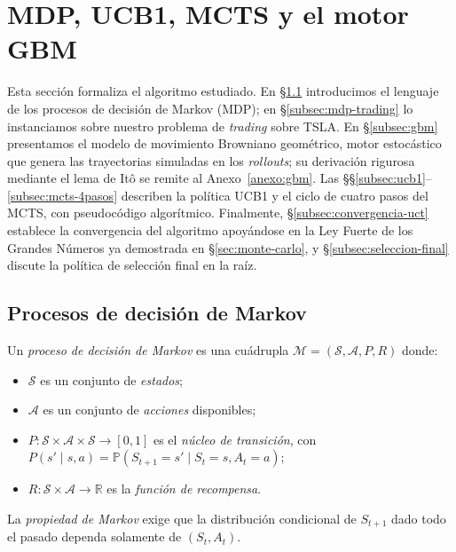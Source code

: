 \section{MDP, UCB1, MCTS y el motor GBM}
\label{sec:mdp-mcts}

Esta sección formaliza el algoritmo estudiado. En §\ref{subsec:mdp} introducimos el lenguaje de los procesos de decisión de Markov (MDP); en §\ref{subsec:mdp-trading} lo instanciamos sobre nuestro problema de \emph{trading} sobre TSLA. En §\ref{subsec:gbm} presentamos el modelo de movimiento Browniano geométrico, motor estocástico que genera las trayectorias simuladas en los \emph{rollouts}; su derivación rigurosa mediante el lema de Itô se remite al Anexo~\ref{anexo:gbm}. Las §§\ref{subsec:ucb1}--\ref{subsec:mcts-4pasos} describen la política UCB1 y el ciclo de cuatro pasos del MCTS, con pseudocódigo algorítmico. Finalmente, §\ref{subsec:convergencia-uct} establece la convergencia del algoritmo apoyándose en la Ley Fuerte de los Grandes Números ya demostrada en §\ref{sec:monte-carlo}, y §\ref{subsec:seleccion-final} discute la política de selección final en la raíz.

\subsection{Procesos de decisión de Markov}
\label{subsec:mdp}

\begin{definicion}
\label{def:mdp}
Un \emph{proceso de decisión de Markov} es una cuádrupla $\mathcal{M} = (\mathcal{S}, \mathcal{A}, P, R)$ donde:
\begin{itemize}
    \item $\mathcal{S}$ es un conjunto de \emph{estados};
    \item $\mathcal{A}$ es un conjunto de \emph{acciones} disponibles;
    \item $P: \mathcal{S} \times \mathcal{A} \times \mathcal{S} \to [0,1]$ es el \emph{núcleo de transición}, con $P(s' \mid s, a) = \mathbb{P}(S_{t+1} = s' \mid S_t = s, A_t = a)$;
    \item $R: \mathcal{S} \times \mathcal{A} \to \mathbb{R}$ es la \emph{función de recompensa}.
\end{itemize}
La \emph{propiedad de Markov} exige que la distribución condicional de $S_{t+1}$ dado todo el pasado dependa solamente de $(S_t, A_t)$.
\end{definicion}

